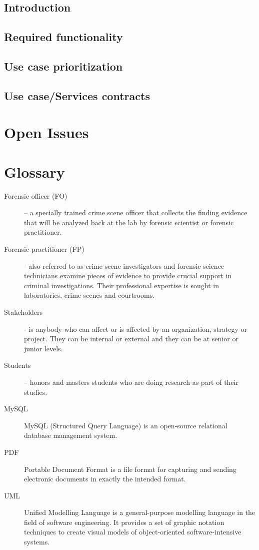 \documentclass[10pt,a4paper]{article}
\begin{document}
\subsection{Introduction}


\subsection{Required functionality}




\subsection{Use case prioritization}


\subsection{Use case/Services contracts}

               
\pagebreak

\section{Open Issues}

\section{Glossary}
\begin{description}
	\item [Forensic officer (FO)] – a specially trained crime scene officer that collects the finding evidence that will be analyzed back at the lab by forensic scientist or forensic practitioner. 
	\item [Forensic practitioner (FP)] - also referred to as crime scene investigators and forensic science technicians examine pieces of evidence to provide crucial support in criminal investigations. Their professional expertise is sought in laboratories, crime scenes and courtrooms.
	\item [Stakeholders] - is anybody who can affect or is affected by an organization, strategy or project. They can be internal or external and they can be at senior or junior levels.
	\item [Students] – honors and masters students who are doing research as part of their studies.
	\item[MySQL] MySQL (Structured Query Language) is an open-source relational database management system.
	
	\item[PDF] Portable Document Format is a file format for capturing and sending electronic documents in exactly the intended format.
	\item[UML] Unified Modelling Language is a general-purpose modelling language in the field of software engineering. It provides a set of graphic notation techniques to create visual models of object-oriented software-intensive systems. 
	

\end{description}
\end{document}
